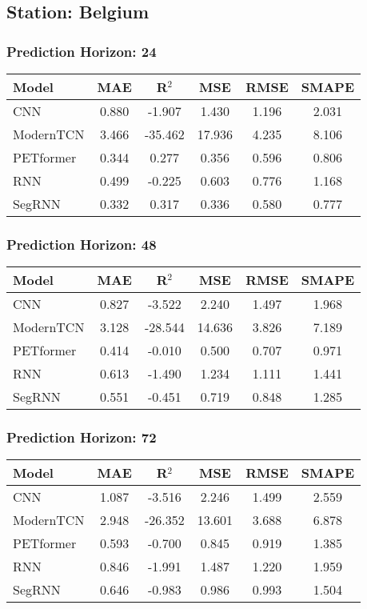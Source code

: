 \subsection*{Station: Belgium}
\subsubsection*{Prediction Horizon: 24}
\begin{tabular}{lccccc}
\toprule
Model & MAE & R$^2$ & MSE & RMSE & SMAPE \\
\midrule
CNN & 0.880 & -1.907 & 1.430 & 1.196 & 2.031 \\
ModernTCN & 3.466 & -35.462 & 17.936 & 4.235 & 8.106 \\
PETformer & 0.344 & 0.277 & 0.356 & 0.596 & 0.806 \\
RNN & 0.499 & -0.225 & 0.603 & 0.776 & 1.168 \\
SegRNN & 0.332 & 0.317 & 0.336 & 0.580 & 0.777 \\
\bottomrule
\end{tabular}
\vspace{0.5cm}
\subsubsection*{Prediction Horizon: 48}
\begin{tabular}{lccccc}
\toprule
Model & MAE & R$^2$ & MSE & RMSE & SMAPE \\
\midrule
CNN & 0.827 & -3.522 & 2.240 & 1.497 & 1.968 \\
ModernTCN & 3.128 & -28.544 & 14.636 & 3.826 & 7.189 \\
PETformer & 0.414 & -0.010 & 0.500 & 0.707 & 0.971 \\
RNN & 0.613 & -1.490 & 1.234 & 1.111 & 1.441 \\
SegRNN & 0.551 & -0.451 & 0.719 & 0.848 & 1.285 \\
\bottomrule
\end{tabular}
\vspace{0.5cm}
\subsubsection*{Prediction Horizon: 72}
\begin{tabular}{lccccc}
\toprule
Model & MAE & R$^2$ & MSE & RMSE & SMAPE \\
\midrule
CNN & 1.087 & -3.516 & 2.246 & 1.499 & 2.559 \\
ModernTCN & 2.948 & -26.352 & 13.601 & 3.688 & 6.878 \\
PETformer & 0.593 & -0.700 & 0.845 & 0.919 & 1.385 \\
RNN & 0.846 & -1.991 & 1.487 & 1.220 & 1.959 \\
SegRNN & 0.646 & -0.983 & 0.986 & 0.993 & 1.504 \\
\bottomrule
\end{tabular}
\vspace{0.5cm}
